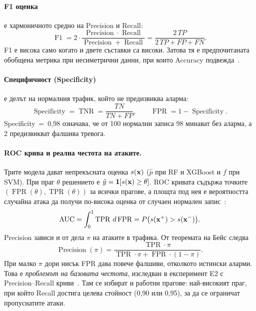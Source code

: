 \paragraph{F1 оценка} е хармоничното средно на Precision и Recall:
\begin{equation}\label{eq:f1}
\operatorname{F1}=2\cdot\frac{\operatorname{Precision}\cdot\operatorname{Recall}}{\operatorname{Precision}+\operatorname{Recall}}=\frac{2\,TP}{2\,TP+FP+FN}.
\end{equation}
F1 е висока само когато и двете съставки са високи. Затова тя е предпочитаната обобщена метрика при несиметрични данни, при които Accuracy подвежда~\cite{borovska2022,saito2015}.

\paragraph{Специфичност (Specificity)} е делът на нормалния трафик, който не предизвиква аларма:
\begin{equation}\label{eq:spec}
\operatorname{Specificity}=\operatorname{TNR}=\frac{TN}{TN+FP},\qquad \operatorname{FPR}=1-\operatorname{Specificity}.
\end{equation}
Specificity~=~0,98 означава, че от 100 нормални записа 98 минават без аларма, а 2 предизвикват фалшива тревога.

\paragraph{ROC крива и реална честота на атаките.} Трите модела дават непрекъсната оценка $s(\mathbf{x})$ ($\hat p$ при RF и XGBoost и $f$ при SVM). При праг $\theta$ решението е $\hat y=\mathbf{1}[s(\mathbf{x})\ge\theta]$. ROC кривата съдържа точките $(\operatorname{FPR}(\theta),\operatorname{TPR}(\theta))$ за всички прагове, а площта под нея е вероятността случайна атака да получи по-висока оценка от случаен нормален запис~\cite{fawcett2006}:
\begin{equation}\label{eq:auc}
\operatorname{AUC}=\int_0^1\operatorname{TPR}\,d\operatorname{FPR}=P\bigl(s(\mathbf{x}^{+})>s(\mathbf{x}^{-})\bigr).
\end{equation}
Precision зависи и от дела $\pi$ на атаките в трафика. От теоремата на Бейс следва~\cite{axelsson2000}
\begin{equation}\label{eq:baserate}
\operatorname{Precision}(\pi)=\frac{\operatorname{TPR}\cdot\pi}{\operatorname{TPR}\cdot\pi+\operatorname{FPR}\cdot(1-\pi)}.
\end{equation}
При малко $\pi$ дори нисък FPR дава повече фалшиви, отколкото истински аларми. Това е \emph{проблемът на базовата честота}, изследван в експеримент E2 с Precision--Recall криви~\cite{saito2015}. Там се избират и работни прагове: най-високият праг, при който Recall достига целева стойност (0,90 или 0,95), за да се ограничат пропуснатите атаки.

